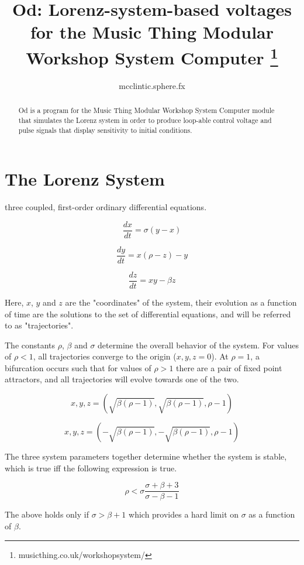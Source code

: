 \documentclass{tufte-handout}
\title{Od: Lorenz-system-based voltages for the Music Thing Modular Workshop System Computer
\thanks{musicthing.co.uk/workshopsystem/}}
\author[mcclintic.sphere.fx]{mcclintic.sphere.fx}
\begin{document}
\maketitle%

\begin{abstract}
\noindent
Od is a program for the Music Thing Modular Workshop System Computer
module that simulates the Lorenz system in order to produce loop-able 
control voltage and pulse signals that display sensitivity to initial conditions.
\end{abstract}


\section{The Lorenz System}\label{sec:the-lorenz-system}

 three coupled, first-order ordinary differential equations.

$$\frac{dx}{dt} = \sigma(y - x)$$

$$\frac{dy}{dt} = x(\rho - z) - y$$

$$\frac{dz}{dt} = x y - \beta z$$

Here, $x$, $y$ and $z$ are the "coordinates" of the system, their evolution as a function of time are the solutions to the set of differential equations, and will be referred to as "trajectories".


The constants $\rho$, $\beta$ and $\sigma$ determine the overall behavior of the system. For values of $\rho < 1$, all trajectories converge to the origin ($x, y, z = 0$). At $\rho=1$, a bifurcation occurs such that for values of $\rho > 1$ there are a pair of fixed point attractors, and all trajectories will evolve towards one of the two.

$$x, y, z = (\sqrt{\beta(\rho - 1)}, \sqrt{\beta(\rho - 1)}, \rho - 1)$$

$$x, y, z = (-\sqrt{\beta(\rho - 1)}, -\sqrt{\beta(\rho - 1)}, \rho - 1)$$

The three system parameters together determine whether the system is stable, which is true iff the following expression is true.

$$\rho < \sigma \frac{\sigma + \beta + 3}{\sigma - \beta - 1}$$ 

The above holds only if $\sigma > \beta + 1$ which provides a hard limit on $\sigma$ as a function of $\beta$.
\end{document}
